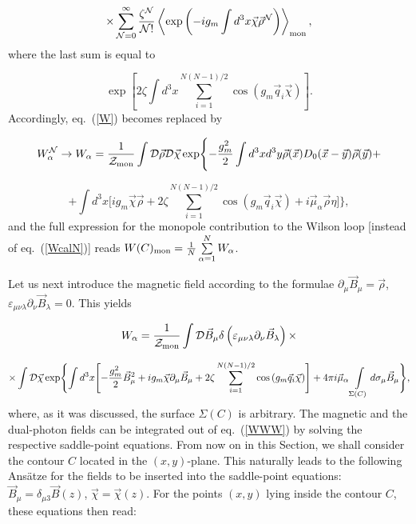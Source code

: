 \documentclass[a4paper,12pt]{article}
\begin{document}
\begin{equation}
\label{II}
\times\sum\limits_{{\cal N}=0}^{\infty}\frac{\zeta^{\cal N}}{{\cal N}!}
\left<\exp\left(-ig_m\int d^3x\vec\chi\vec\rho^{\cal N}\right)\right>_{\rm mon},
\end{equation}
where the last sum is equal to

\begin{equation}
\label{III}
\exp\left[2\zeta\int d^3x
\sum\limits_{i=1}^{N(N-1)/2}
\cos\left(g_m\vec q_i\vec\chi\right)\right].
\end{equation}
Accordingly, eq.~(\ref{W}) becomes replaced by

$$
W_\alpha^{\cal N}\to W_\alpha=\frac{1}{{\cal Z}_{\rm mon}}
\int{\cal D}\vec\rho{\cal D}\vec\chi\exp\Biggl\{-\frac{g_m^2}{2}\int d^3x d^3y\vec\rho(\vec x)D_0(\vec x-\vec y)
\vec\rho(\vec y)+$$

$$+\int d^3x\Biggl[ig_m\vec\chi\vec\rho+
2\zeta
\sum\limits_{i=1}^{N(N-1)/2}
\cos\left(g_m\vec q_i\vec\chi\right)+
i\vec\mu_\alpha\vec\rho\eta\Biggr]\Biggr\},$$
and the full expression for the monopole contribution to the Wilson loop [instead of eq.~(\ref{WcalN})]
reads $W(C)_{\rm mon}=\frac{1}{N}\sum\limits_{\alpha=1}^{N}W_\alpha$.

Let us next introduce the magnetic field according to the formulae $\partial_\mu\vec B_\mu=\vec\rho$,
$\varepsilon_{\mu\nu\lambda}\partial_\nu\vec B_\lambda=0$. This yields

$$
W_\alpha=\frac{1}{{\cal Z}_{\rm mon}}
\int{\cal D}\vec B_\mu\delta\left(\varepsilon_{\mu\nu\lambda}\partial_\nu\vec B_\lambda\right)\times$$

\begin{equation}
\label{WWW}
\times\int {\cal D}\vec\chi
\exp\Biggl\{\int d^3x\Biggl[-\frac{g_m^2}{2}\vec B_\mu^2+
ig_m\vec\chi\partial_\mu\vec B_\mu+
2\zeta
\sum\limits_{i=1}^{N(N-1)/2}
\cos\left(g_m\vec q_i\vec\chi\right)\Biggr]+
4\pi i\vec\mu_\alpha\int\limits_{\Sigma(C)}^{}d\sigma_\mu\vec B_\mu\Biggr\},
\end{equation}
where, as it was discussed, the surface $\Sigma(C)$ is arbitrary.
The magnetic and the dual-photon fields
can be integrated out of eq.~(\ref{WWW}) by solving the respective saddle-point equations.
From now on in this Section, we shall
consider the contour $C$ located in the $(x,y)$-plane. This naturally leads to the following Ans\"atze for the
fields to be inserted into the saddle-point equations:
$\vec B_\mu=\delta_{\mu 3}\vec B(z)$, $\vec\chi=\vec\chi(z)$.
For the points
$(x,y)$ lying inside the contour $C$, these equations then read:
\end{document}
